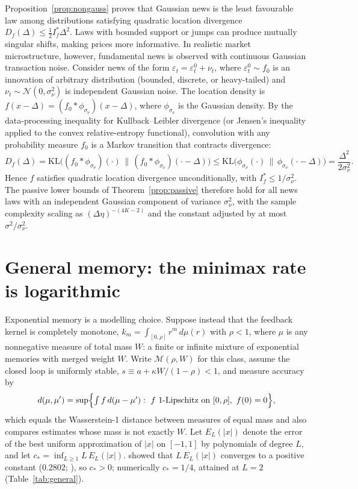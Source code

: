\documentclass[12pt]{article}
\theoremstyle{definition}
\theoremstyle{remark}
\begin{document}
Proposition~\ref{prop:nongauss} proves that Gaussian news is the least favourable law among distributions satisfying quadratic location divergence $D_f(\Delta)\le\frac12I^*_f\Delta^2$. Laws with bounded support or jumps can produce mutually singular shifts, making prices more informative. In realistic market microstructure, however, fundamental news is observed with continuous Gaussian transaction noise. Consider news of the form $\varepsilon_t=\varepsilon^0_t+\nu_t$, where $\varepsilon^0_t\sim f_0$ is an innovation of arbitrary distribution (bounded, discrete, or heavy-tailed) and $\nu_t\sim\mathcal N(0,\sigma_\nu^2)$ is independent Gaussian noise. The location density is $f(x-\Delta)=(f_0*\phi_{\sigma_\nu})(x-\Delta)$, where $\phi_{\sigma_\nu}$ is the Gaussian density. By the data-processing inequality for Kullback--Leibler divergence (or Jensen's inequality applied to the convex relative-entropy functional), convolution with any probability measure $f_0$ is a Markov transition that contracts divergence:
\[
D_f(\Delta) = \mathrm{KL}\bigl((f_0*\phi_{\sigma_\nu})(\cdot)\,\big\|\,(f_0*\phi_{\sigma_\nu})(\cdot-\Delta)\bigr) \le \mathrm{KL}\bigl(\phi_{\sigma_\nu}(\cdot)\,\big\|\,\phi_{\sigma_\nu}(\cdot-\Delta)\bigr) = \frac{\Delta^2}{2\sigma_\nu^2}.
\]
Hence $f$ satisfies quadratic location divergence unconditionally, with $I^*_f\le1/\sigma_\nu^2$. The passive lower bounds of Theorem~\ref{prop:passive} therefore hold for all news laws with an independent Gaussian component of variance $\sigma_\nu^2$, with the sample complexity scaling as $(\Delta\eta)^{-(4K-2)}$ and the constant adjusted by at most $\sigma^2/\sigma_\nu^2$.

\section{General memory: the minimax rate is logarithmic}\label{sec:general}

Exponential memory is a modelling choice. Suppose instead that the feedback kernel is completely monotone, $k_m=\int_{[0,\rho]}r^m\,d\mu(r)$ with $\rho<1$, where $\mu$ is any nonnegative measure of total mass $W$: a finite or infinite mixture of exponential memories with merged weight $W$. Write $\mathcal M(\rho,W)$ for this class, assume the closed loop is uniformly stable, $s\equiv a+\kappa W/(1-\rho)<1$, and measure accuracy by
\[
d(\mu,\mu')=\sup\Bigl\{\textstyle\int f\,d(\mu-\mu'):\ f\ \text{1-Lipschitz on }[0,\rho],\ f(0)=0\Bigr\},
\]
which equals the Wasserstein-1 distance between measures of equal mass and also compares estimates whose mass is not exactly $W$. Let $E_L(|x|)$ denote the error of the best uniform approximation of $|x|$ on $[-1,1]$ by polynomials of degree $L$, and let $c_*=\inf_{L\ge1}L\,E_L(|x|)$. \citet{bernstein1914} showed that $L\,E_L(|x|)$ converges to a positive constant ($0.2802$; \citealp{varga1985}), so $c_*>0$; numerically $c_*=1/4$, attained at $L=2$ (Table~\ref{tab:general}).
\end{document}
